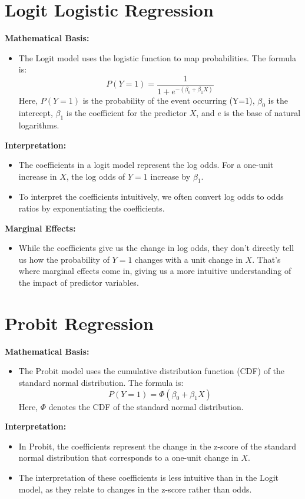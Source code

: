 \documentclass{article}
\begin{document}
\section*{Logit Logistic Regression}

\textbf{Mathematical Basis:}
\begin{itemize}
  \item The Logit model uses the logistic function to map probabilities. The formula is: 
  \[ P(Y=1) = \frac{1}{1 + e^{-(\beta_0 + \beta_1 X)}} \]
  Here, $P(Y=1)$ is the probability of the event occurring (Y=1), $\beta_0$ is the intercept, $\beta_1$ is the coefficient for the predictor $X$, and $e$ is the base of natural logarithms.
\end{itemize}

\textbf{Interpretation:}
\begin{itemize}
  \item The coefficients in a logit model represent the log odds. For a one-unit increase in $X$, the log odds of $Y=1$ increase by $\beta_1$.
  \item To interpret the coefficients intuitively, we often convert log odds to odds ratios by exponentiating the coefficients.
\end{itemize}

\textbf{Marginal Effects:}
\begin{itemize}
  \item While the coefficients give us the change in log odds, they don't directly tell us how the probability of $Y=1$ changes with a unit change in $X$. That's where marginal effects come in, giving us a more intuitive understanding of the impact of predictor variables.
\end{itemize}

\section*{Probit Regression}

\textbf{Mathematical Basis:}
\begin{itemize}
  \item The Probit model uses the cumulative distribution function (CDF) of the standard normal distribution. The formula is:
  \[ P(Y=1) = \Phi(\beta_0 + \beta_1 X) \]
  Here, $\Phi$ denotes the CDF of the standard normal distribution.
\end{itemize}

\textbf{Interpretation:}
\begin{itemize}
  \item In Probit, the coefficients represent the change in the z-score of the standard normal distribution that corresponds to a one-unit change in $X$.
  \item The interpretation of these coefficients is less intuitive than in the Logit model, as they relate to changes in the z-score rather than odds.
\end{itemize}
\end{document}

